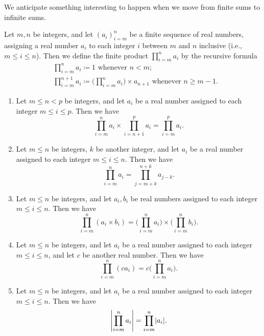 \begin{remark}\label{7.1.15}
We anticipate something interesting to happen when we move from finite sums to infinite sums.
\end{remark}

\begin{additional corollary}\label{ac 7.1.1}
Let \(m, n\) be integers, and let \((a_i)_{i = m}^n\) be a finite sequence of real numbers, assigning a real number \(a_i\) to each integer \(i\) between \(m\) and \(n\) inclusive (i.e., \(m \leq i \leq n\)).
Then we define the finite product \(\prod_{i = m}^n a_i\) by the recursive formula
\begin{align*}
& \prod_{i = m}^n a_i \coloneqq 1 \text{ whenever } n < m; \\
& \prod_{i = m}^{n + 1} a_i \coloneqq \Bigg(\prod_{i = m}^n a_i\Bigg) \times a_{n + 1} \text{ whenever } n \geq m - 1.
\end{align*}
\end{additional corollary}

\begin{additional corollary}\label{ac 7.1.2}
    \mbox{}
    \begin{enumerate}
        \item Let \(m \leq n < p\) be integers, and let \(a_i\) be a real number assigned to each integer \(m \leq i \leq p\).
        Then we have
        \[
            \prod_{i = m}^n a_i \times \prod_{i = n + 1}^p a_i = \prod_{i = m}^p a_i.
        \]
        \item Let \(m \leq n\) be integers, \(k\) be another integer, and let \(a_i\) be a real number assigned to each integer \(m \leq i \leq n\).
        Then we have
        \[
            \prod_{i = m}^n a_i = \prod_{j = m + k}^{n + k} a_{j - k}.
        \]
        \item Let \(m \leq n\) be integers, and let \(a_i, b_i\) be real numbers assigned to each integer \(m \leq i \leq n\).
        Then we have
        \[
            \prod_{i = m}^n (a_i \times b_i) = \Bigg(\prod_{i = m}^n a_i\Bigg) \times \Bigg(\prod_{i = m}^n b_i\Bigg).
        \]
        \item Let \(m \leq n\) be integers, and let \(a_i\) be a real number assigned to each integer \(m \leq i \leq n\), and let \(c\) be another real number.
        Then we have
        \[
            \prod_{i = m}^n (ca_i) = c\Bigg(\prod_{i = m}^n a_i\Bigg).
        \]
        \item Let \(m \leq n\) be integers, and let \(a_i\) be a real number assigned to each integer \(m \leq i \leq n\).
        Then we have
        \[
            \abs*{\prod_{i = m}^n a_i} = \prod_{i = m}^n \abs*{a_i}.
        \]
    \end{enumerate}
\end{additional corollary}


